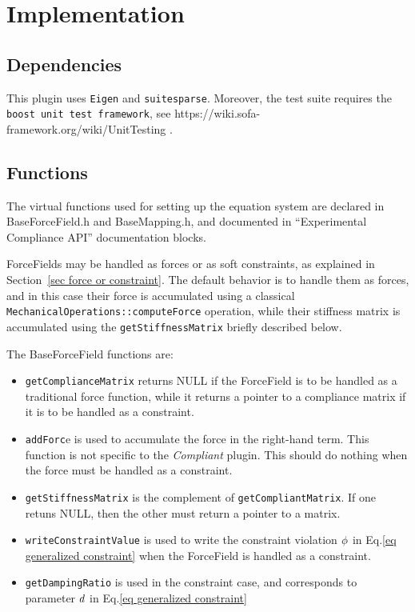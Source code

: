 \section{Implementation} \label{sec implementation}

\subsection{Dependencies}
This plugin uses \texttt{Eigen} and \texttt{suitesparse}. Moreover, the test suite requires the \texttt{boost unit test framework}, see https://wiki.sofa-framework.org/wiki/UnitTesting  .

\subsection{Functions}

The virtual functions used for setting up the equation system are declared in BaseForceField.h and BaseMapping.h, and documented in ``Experimental Compliance API'' documentation blocks.

ForceFields may be handled as forces or as soft constraints, as explained in Section~\ref{sec force or constraint}. The default behavior is to handle them as forces, and in this case their force is accumulated using a classical \texttt{MechanicalOperations::computeForce} operation, while their stiffness matrix is accumulated using the \texttt{getStiffnessMatrix} briefly described below.

The BaseForceField functions are:
\begin{itemize}
 \item \texttt{getComplianceMatrix} returns NULL if the ForceField is to be handled as a traditional force function, while it returns a pointer to a compliance matrix if it is to be handled as a constraint.
 \item \texttt{addForc}e is used to accumulate the force in the right-hand term. This function is not specific to the \textit{Compliant} plugin. This should do nothing when the force must be handled as a constraint.
 \item \texttt{getStiffnessMatrix} is the complement of \texttt{getCompliantMatrix}. If one retuns NULL, then the other must return a pointer to a matrix.
 \item \texttt{writeConstraintValue} is used to write the constraint violation $\phi$ in Eq.\ref{eq generalized constraint} when the ForceField is handled as a constraint.
 \item \texttt{getDampingRatio} is used in the constraint case, and corresponds to parameter $ d$ in Eq.\ref{eq generalized constraint}
\end{itemize}

